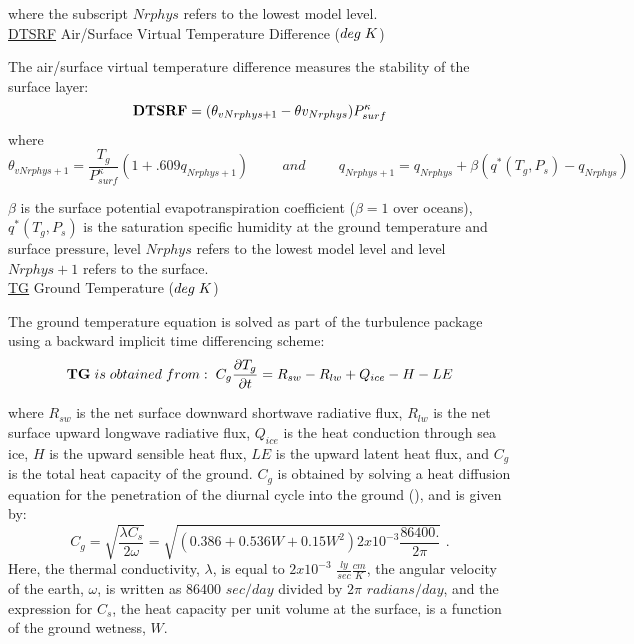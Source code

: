 \noindent
where the subscript $Nrphys$ refers to the lowest model level.
\\
 
\noindent
{ \underline {DTSRF}  Air/Surface Virtual Temperature Difference ($deg \hspace{.1cm} K$) }

\noindent
The air/surface virtual temperature difference measures the stability of the surface layer:
\[
{\bf DTSRF} = (\theta_{v{Nrphys+1}} - \theta{v_{Nrphys}}) P^{\kappa}_{surf}
\]
\noindent
where
\[
\theta_{v{Nrphys+1}} = \frac{ T_g }{ P^{\kappa}_{surf} } (1 + .609 q_{Nrphys+1}) \hspace{1cm}
and \hspace{1cm} q_{Nrphys+1} = q_{Nrphys} + \beta(q^*(T_g,P_s) - q_{Nrphys})
\]

\noindent
$\beta$ is the surface potential evapotranspiration coefficient ($\beta=1$ over oceans),
$q^*(T_g,P_s)$ is the saturation specific humidity at the ground temperature 
and surface pressure, level $Nrphys$ refers to the lowest model level and level $Nrphys+1$ 
refers to the surface.
\\

 
\noindent
{ \underline {TG}  Ground Temperature ($deg \hspace{.1cm} K$) }

\noindent
The ground temperature equation is solved as part of the turbulence package
using a backward implicit time differencing scheme:
\[
{\bf TG} \hspace{.1cm} is \hspace{.1cm} obtained \hspace{.1cm} from: \hspace{.1cm}
C_g\frac{\partial T_g}{\partial t} = R_{sw} - R_{lw} + Q_{ice} - H - LE
\]

\noindent
where $R_{sw}$ is the net surface downward shortwave radiative flux, $R_{lw}$ is the
net surface upward longwave radiative flux, $Q_{ice}$ is the heat conduction through
sea ice, $H$ is the upward sensible heat flux, $LE$ is the upward latent heat
flux, and $C_g$ is the total heat capacity of the ground. 
$C_g$ is obtained by solving a heat diffusion equation 
for the penetration of the diurnal cycle into the ground (\cite{black:77}), and is given by:
\[
C_g = \sqrt{ \frac{\lambda C_s }{ 2 \omega } } = \sqrt{(0.386 + 0.536W + 0.15W^2)2x10^{-3}
\frac{86400.}{2\pi} } \, \, .
\]
\noindent
Here, the thermal conductivity, $\lambda$, is equal to $2x10^{-3}$ $\frac{ly}{sec} 
\frac{cm}{K}$, 
the angular velocity of the earth, $\omega$, is written as $86400$ $sec/day$ divided 
by $2 \pi$ $radians/
day$, and the expression for $C_s$, the heat capacity per unit volume at the surface, 
is a function of the ground wetness, $W$. 
\\

